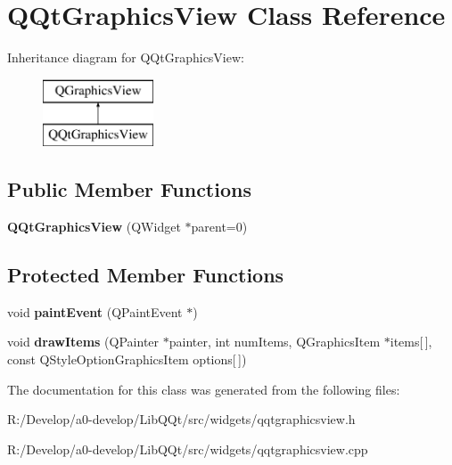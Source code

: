 \hypertarget{class_q_qt_graphics_view}{}\section{Q\+Qt\+Graphics\+View Class Reference}
\label{class_q_qt_graphics_view}
Inheritance diagram for Q\+Qt\+Graphics\+View\+:\begin{figure}[H]
\begin{center}
\leavevmode
\includegraphics[height=2.000000cm]{class_q_qt_graphics_view}
\end{center}
\end{figure}
\subsection*{Public Member Functions}
\begin{DoxyCompactItemize}
\item 
\mbox{\label{class_q_qt_graphics_view_a8a286f4f6d484a6a4f5c9d5742e46d63}} 
{\bfseries Q\+Qt\+Graphics\+View} (Q\+Widget $\ast$parent=0)
\end{DoxyCompactItemize}
\subsection*{Protected Member Functions}
\begin{DoxyCompactItemize}
\item 
\mbox{\label{class_q_qt_graphics_view_a33b30d205f913c69ffe1e67558067dbf}} 
void {\bfseries paint\+Event} (Q\+Paint\+Event $\ast$)
\item 
\mbox{\label{class_q_qt_graphics_view_abdddcb26f184b8d56709669bd05a4dba}} 
void {\bfseries draw\+Items} (Q\+Painter $\ast$painter, int num\+Items, Q\+Graphics\+Item $\ast$items\mbox{[}$\,$\mbox{]}, const Q\+Style\+Option\+Graphics\+Item options\mbox{[}$\,$\mbox{]})
\end{DoxyCompactItemize}


The documentation for this class was generated from the following files\+:\begin{DoxyCompactItemize}
\item 
R\+:/\+Develop/a0-\/develop/\+Lib\+Q\+Qt/src/widgets/qqtgraphicsview.\+h\item 
R\+:/\+Develop/a0-\/develop/\+Lib\+Q\+Qt/src/widgets/qqtgraphicsview.\+cpp\end{DoxyCompactItemize}
